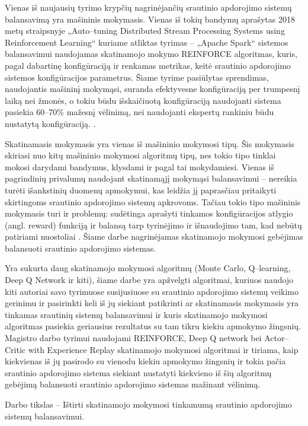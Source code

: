 \documentclass{VUMIFPSbakalaurinis}
\begin{document}
Vienas iš naujausių tyrimo krypčių nagrinėjančių srautinio apdorojimo sistemų balansavimą yra mašininis mokymasis. Vienas iš tokių bandymų aprašytas 2018 metų straipsnyje „Auto–tuning Distributed Stream Processing Systems using Reinforcement Learning“\cite{vaquero2018autotuning} kuriame atliktas tyrimas – „Apache Spark“ sistemos balansavimui naudojamas skatinamojo mokymo REINFORCE algoritmas, kuris, pagal dabartinę konfigūraciją ir renkamas metrikas, keitė srautinio apdorojimo sistemos konfigūracijos parametrus. Šiame tyrime pasiūlytas sprendimas, naudojantis mašininį mokymąsi, suranda efektyvesne konfigūraciją per trumpesnį laiką nei žmonės, o tokiu būdu išskaičiuotą konfigūraciją naudojanti sistema pasiekia 60–70\% mažesnį vėlinimą, nei naudojanti ekspertų rankiniu būdu nustatytą konfigūraciją. \cite{vaquero2018autotuning}. 

Skatinamasis mokymasis yra vienas iš mašininio mokymosi tipų. Šis mokymasis skiriasi nuo kitų mašininio mokymosi algoritmų tipų, nes tokio tipo tinklai mokosi darydami bandymus, klysdami ir pagal tai mokydamiesi. Vienas iš pagrindinių privalumų naudojant skatinamąjį mokymąsi balansavimui – nereikia turėti išankstinių duomenų apmokymui, kas leidžia jį paprasčiau pritaikyti skirtingoms srautinio apdorojimo sistemų apkrovoms. Tačiau tokio tipo mašininis mokymasis turi ir problemų: sudėtinga aprašyti tinkamos konfigūracijos atlygio (angl. reward) funkciją ir balansą tarp tyrinėjimo ir išnaudojimo tam, kad nebūtų patiriami nuostoliai \cite{selfRegulatingStreaming}. Šiame darbe nagrinėjamas skatinamojo mokymosi gebėjimas balansuoti srautinio apdorojimo sistemas.

Yra sukurta daug skatinamojo mokymosi algoritmų (Monte Carlo, Q–learning, Deep Q Network ir kiti), šiame darbe yra apžvelgti algoritmai, kuriuos naudojo kiti autoriai savo tyrimuose susijusiuose su srautinio apdorojimo sistemų veikimo gerinimu ir pasirinkti keli iš jų siekiant patikrinti ar skatinamasis mokymasis yra tinkamas srautinių sistemų balansavimui ir kuris skatinamojo mokymosi algoritmas pasiekia geriausius rezultatus su tam tikru kiekiu apmokymo žingsnių. Magistro darbo tyrimui naudojami REINFORCE, Deep Q network bei Actor–Critic with Experience Replay skatinamojo mokymosi algoritmai ir tiriama, kaip kiekvienas iš jų pasirodo su vienodu kiekiu apmokymo žingsnių ir tokia pačia srautinio apdorojimo sistema siekiant nustatyti kiekvieno iš šių algoritmų gebėjimą balansuoti srautinio apdorojimo sistemas mažinant vėlinimą.

Darbo tikslas – Ištirti skatinamojo mokymosi tinkamumą srautinio apdorojimo sistemų \mbox{balansavimui.}
\end{document}
